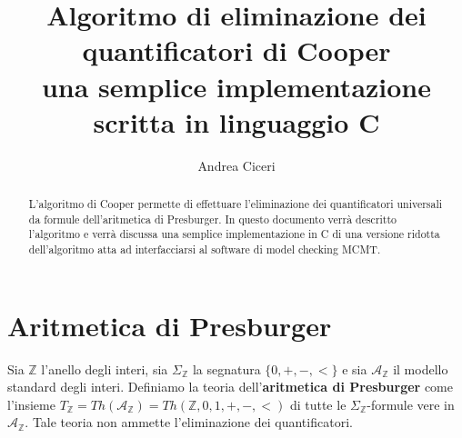\documentclass[11pt,letterpaper,twoside]{article}
\begin{document}
\newcommand{\src}[2]{\inputminted[linenos, mathescape=true, firstline={#1},
  lastline={#2}]{C}{../cooper.c}}
\newcommand{\inline}[1]{\texttt{#1}}


\newcommand{\srcf}[1]{\pyc{print(lines("#1"))}}

\title{%
  Algoritmo di eliminazione dei quantificatori di Cooper\\
  \large una semplice implementazione scritta in linguaggio C}
\author{Andrea Ciceri}
\maketitle

\begin{abstract} L'algoritmo di Cooper permette di effettuare l'eliminazione dei
quantificatori universali da formule dell'aritmetica di Presburger. In questo
documento verrà descritto l'algoritmo e verrà discussa una semplice
implementazione in C di una versione ridotta dell'algoritmo atta ad
interfacciarsi al software di model checking MCMT\autocite{mcmt}.
\end{abstract}

\section{Aritmetica di Presburger} Sia $\mathbb{Z}$ l'anello degli interi, sia
$\Sigma_{\mathbb{Z}}$ la segnatura $\{0, +, -, <\}$ e sia
$\mathcal{A}_{\mathbb{Z}}$ il modello standard degli interi.  Definiamo la
teoria dell'\textbf{aritmetica di Presburger} come l'insieme
$T_{\mathbb{Z}}=Th(\mathcal{A}_{\mathbb{Z}})=Th(\mathbb{Z}, 0, 1, +, -, <)$ di
tutte le $\Sigma_{\mathbb{Z}}$-formule vere in $\mathcal{A}_{\mathbb{Z}}$.  Tale
teoria non ammette l'eliminazione dei quantificatori.
\end{document}
